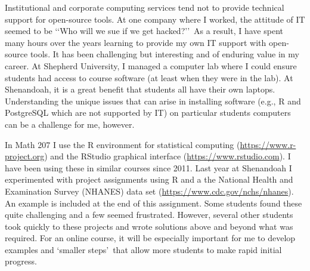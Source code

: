 \documentclass[10pt]{article}
\begin{document}
Institutional and corporate computing services tend not to provide
technical support for open-source tools.  At one company where I worked, the attitude 
of IT seemed to be \lq\lq Who will we sue if we get hacked?\rq\rq\  As a result, I have
spent many hours over the years learning to provide my own IT support with open-source tools.
It has been challenging but interesting and of enduring value in my career.  At Shepherd 
University, I managed a computer lab where I could ensure students had access to course software
(at least when they were in the lab).  At Shenandoah, it is a great benefit that students all
have their own laptops.  Understanding the unique issues that can arise in installing software 
(e.g., R and PostgreSQL which are not supported by IT) 
on particular students computers can be a challenge for me, however.
\vfill
\eject

In Math 207 I use the R environment for statistical computing
(\href{https://www.r-project.org}{https://www.r-project.org}) and the 
RStudio graphical interface (\href{https://www.rstudio.com}{https://www.rstudio.com}).
I have been using these in similar courses since 2011.  Last year at Shenandoah I 
experimented with project assignments using R and a the National Health and Examination
Survey (NHANES) data set (\href{https://www.cdc.gov/nchs/nhanes}{https://www.cdc.gov/nchs/nhanes}).
An example is included at the end of this assignment.
Some students found these quite challenging and a few seemed frustrated.  
However, several other students took quickly to these projects
and wrote solutions above and beyond what was 
required. 
For an  online course, it will be especially important for me to develop examples 
and \lq smaller steps\rq\ that
allow more students to make rapid initial progress.  
\end{document}

